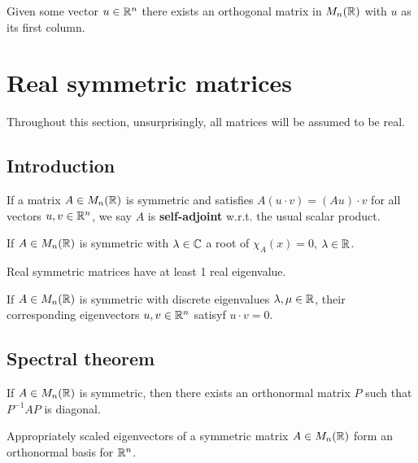 \documentclass[../Year1/Year1.tex]{subfiles}
\begin{document}
\begin{corollary}
    Given some vector $u\in\mathbb{R}^n$ there exists an orthogonal matrix in $M_n(\mathbb{R})$ with $u$ as its first column.
\end{corollary}

\section{Real symmetric matrices}
Throughout this section, unsurprisingly, all matrices will be assumed to be real.
\subsection{Introduction}

\begin{definition}
    If a matrix $A\in M_n(\mathbb{R})$ is symmetric and satisfies $A(u\cdot v) = (Au)\cdot v$ for all vectors $u,v\in\mathbb{R}^n$, we say $A$ is \textbf{self-adjoint} w.r.t. the usual scalar product.
\end{definition}

\begin{theorem}
    If $A\in M_n(\mathbb{R})$ is symmetric with $\lambda\in\mathbb{C}$ a root of $\chi_A(x)=0$, $\lambda\in\mathbb{R}$.
\end{theorem}

\begin{corollary}
    Real symmetric matrices have at least 1 real eigenvalue.
\end{corollary}

\begin{theorem}
    If $A\in M_n(\mathbb{R})$ is symmetric with discrete eigenvalues $\lambda,\mu\in\mathbb{R}$, their corresponding eigenvectors $u,v\in\mathbb{R}^n$ satisyf $u\cdot v=0$.
\end{theorem}

\subsection{Spectral theorem}
    
\begin{theorem}
    If $A\in M_n(\mathbb{R})$ is symmetric, then there exists an orthonormal matrix $P$ such that $P^{-1}AP$ is diagonal.
\end{theorem}

\begin{corollary}
    Appropriately scaled eigenvectors of a symmetric matrix $A\in M_n(\mathbb{R})$ form an orthonormal basis for $\mathbb{R}^n$.
\end{corollary}
\end{document}

